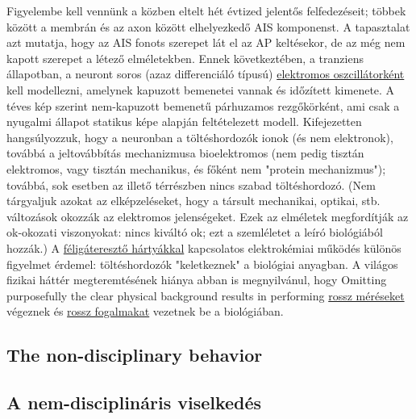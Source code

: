 Figyelembe kell vennünk a közben eltelt hét évtized jelentős felfedezéseit;
többek között a membrán és az axon között elhelyezkedő \gls{AIS} komponenst.
A tapasztalat azt mutatja, hogy az  \gls{AIS} fonots szerepet lát el
az \gls{AP} keltésekor, de az még nem kapott szerepet
a létező elméletekben.
Ennek következtében, a tranziens állapotban, a neuront soros (azaz differenciáló típusú)
\hyperlink{PhysicsOscillator}
{elektromos oszcillátorként} kell modellezni, amelynek kapuzott bemenetei vannak és időzített kimenete. A téves kép szerint nem-kapuzott bemenetű párhuzamos
rezgőkörként, ami csak a nyugalmi állapot statikus képe alapján feltételezett modell.
Kifejezetten hangsúlyozzuk, hogy a neuronban a töltéshordozók ionok
(és nem elektronok), továbbá a jeltovábbítás mechanizmusa bioelektromos
(nem pedig tisztán elektromos, vagy tisztán mechanikus, és főként nem
"protein mechanizmus"); továbbá, sok esetben az illető térrészben
nincs szabad töltéshordozó.
(Nem tárgyaljuk azokat az elképzeléseket, hogy a társult
mechanikai, optikai, stb. változások okozzák az elektromos jelenségeket.
Ezek az elméletek megfordítják az ok-okozati viszonyokat: nincs kiváltó ok; 
ezt a szemléletet a leíró biológiából hozzák.)
A \hyperlink{ThermodynamicElectricField}{féligáteresztő hártyákkal} kapcsolatos  elektrokémiai működés különös figyelmet érdemel: 
töltéshordozók "keletkeznek" a biológiai anyagban.
A világos fizikai háttér megteremtésének hiánya abban is megnyilvánul,
hogy 
Omitting purposefully the clear physical background results in performing
\hyperlink{voltage-clamping}{rossz méréseket} végeznek és  \hyperlink{PhysiologyFallacy}{rossz fogalmakat} vezetnek be a biológiában.

\fi

\ifx\magyar\undefined
\subsection[The non-disciplinary behavior]{The non-disciplinary behavior\label{sec:Model-Non-disciplinary}}

\else

\subsection[A nem-diszciplináris viselkedés]{A nem-disciplináris viselkedés\label{sec:Model-Non-disciplinary}}
\fi

